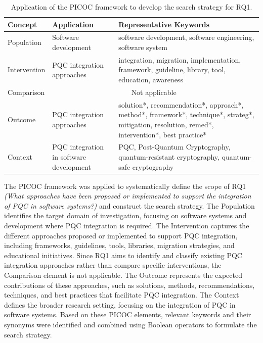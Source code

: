 \documentclass[letterpaper,twocolumn,10pt]{article}
\begin{document}
\begin{table}[!t]
\centering
\caption{Application of the PICOC framework to develop the search strategy for RQ1.}
\label{tab:PICOC}
\small
\begin{tabular}{p{1.5cm}p{3.5cm}p{9cm} }
\toprule
\textbf{Concept} & \textbf{Application} & \textbf{Representative Keywords} \\
\midrule
Population &
Software development &
software development, software engineering, software system \\

Intervention &
PQC integration approaches &
integration, migration, implementation, framework, guideline, library, tool, education, awareness \\

Comparison &
\multicolumn{2}{c}{Not applicable}\\

Outcome &
PQC integration approaches &
solution*, recommendation*, approach*, method*, framework*, technique*, strateg*, mitigation, resolution, remed*, intervention*, best practice* \\

Context &
PQC integration in software development &
PQC, Post-Quantum Cryptography, quantum-resistant cryptography, quantum-safe cryptography \\
\bottomrule
\end{tabular}
\end{table}
\FloatBarrier

The PICOC framework was applied to systematically define the scope of RQ1 \textit{(What approaches have been proposed or implemented to support the integration of PQC in software systems?)} and construct the search strategy. The Population identifies the target domain of investigation, focusing on software systems and development where PQC integration is required. The Intervention captures the different approaches proposed or implemented to support PQC integration, including frameworks, guidelines, tools, libraries, migration strategies, and educational initiatives. Since RQ1 aims to identify and classify existing PQC integration approaches rather than compare specific interventions, the Comparison element is not applicable. The Outcome represents the expected contributions of these approaches, such as solutions, methods, recommendations, techniques, and best practices that facilitate PQC integration. The Context defines the broader research setting, focusing on the integration of PQC in software systems. Based on these PICOC elements, relevant keywords and their synonyms were identified and combined using Boolean operators to formulate the search strategy.
\end{document}
